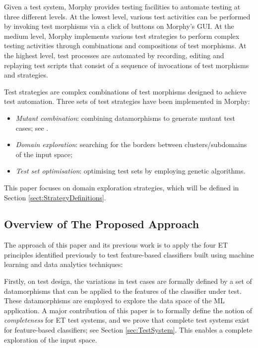 \documentclass[preprint,1p,authoryear,times]{elsarticle}
\begin{document}
Given a test system, Morphy provides testing facilities to automate testing at three different levels. At the lowest level, various test activities can be performed by invoking test morphisms via a click of buttons on Morphy's GUI. At the medium level, Morphy implements various test strategies to perform complex testing activities through combinations and compositions of test morphisms. At the highest level, test processes are automated by recording, editing and replaying test scripts that consist of a sequence of invocations of test morphisms and strategies. 

Test strategies are complex combinations of test morphisms designed to achieve test automation. Three sets of test strategies have been implemented in Morphy: 

\begin{itemize}
 \item \emph{Mutant combination}: combining datamorphisms to generate mutant test cases; see \citep{AITest2020TR}. 
 \item \emph{Domain exploration}: searching for the borders between clusters/subdomains of the input space; 
 \item \emph{Test set optimisation}: optimising test sets by employing genetic algorithms. 
 \end{itemize}
 
This paper focuses on domain exploration strategies, which will be defined in Section \ref{sect:StrategyDefinitions}. 

\subsection{Overview of The Proposed Approach}

The approach of this paper and its previous work \citep{AST2020} is to apply the four ET principles identified previously to test feature-based classifiers built using machine learning and data analytics techniques: 

Firstly, on test design, the variations in test cases are formally defined by a set of datamorphisms that can be applied to the features of the classifier under test. These datamorphisms are employed to explore the data space of the ML application. A major contribution of this paper is to formally define the notion of \emph{completeness} for ET test systems, and we prove that complete test systems exist for feature-based classifiers; see Section \ref{sec:TestSystem}. This enables a complete exploration of the input space. 
\end{document}
